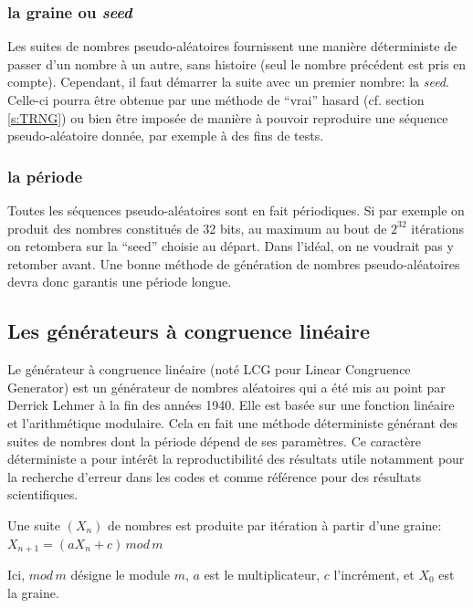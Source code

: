 \documentclass{scrartcl}
\begin{document}
\subsubsection{la graine ou \textit{seed}}
Les suites de nombres pseudo-aléatoires fournissent une manière déterministe de
passer d'un nombre à un autre, sans histoire (seul le nombre précédent est pris
en compte). Cependant, il faut démarrer la suite avec un premier nombre: la
\textit{seed}. Celle-ci pourra être obtenue par une méthode de ``vrai'' hasard
(cf. section \ref{s:TRNG}) ou bien être imposée de manière à pouvoir reproduire
une séquence pseudo-aléatoire donnée, par exemple à des fins de tests.
\subsubsection{la période}
Toutes les séquences pseudo-aléatoires sont en fait périodiques. Si par exemple
on produit des nombres constitués de 32 bits, au maximum au bout de $2^{32}$
itérations on retombera sur la ``seed'' choisie au départ. Dans l'idéal, on ne
voudrait pas y retomber avant. Une bonne méthode de génération de nombres
pseudo-aléatoires devra donc garantis une période longue.

\subsection{Les générateurs à congruence linéaire}
Le générateur à congruence linéaire (noté LCG pour Linear Congruence Generator)
est un générateur de nombres aléatoires qui a été mis au point par Derrick
Lehmer à la fin des années 1940. Elle est basée sur une fonction linéaire et
l'arithmétique modulaire. Cela en fait une méthode déterministe générant des
suites de nombres dont la période dépend de ses paramètres.  Ce caractère
déterministe a pour intérêt la reproductibilité des résultats utile notamment
pour la recherche d'erreur dans les codes et comme référence pour des résultats
scientifiques.\par
Une suite $(X_n)$ de nombres est produite par itération à partir d'une
graine:\linebreak
$X_{n+1} = (a X_n +c)\, mod\, m$\par
Ici, $mod \, m$ désigne le module $m$, $a$ est le multiplicateur, $c$
l'incrément,
et $X_0$ est la graine. \par
\end{document}
